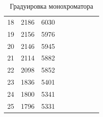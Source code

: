 \documentclass[a4paper, 12pt]{article}%
\begin{document}
\begin{table}[H]
\begin{center}
{\begin{tabular}{|rrr|rrrrrr}
					\multicolumn{1}{|r|}{18}    & \multicolumn{1}{r|}{2186}            & 6030                                                 &                      &                      &                       &                            &                                      &                                                      \\ \cline{1-3}
					\multicolumn{1}{|r|}{19}    & \multicolumn{1}{r|}{2156}            & 5976                                                 &                      &                      &                       &                            &                                      &                                                      \\ \cline{1-3}
					\multicolumn{1}{|r|}{20}    & \multicolumn{1}{r|}{2146}            & 5945                                                 &                      &                      &                       &                            &                                      &                                                      \\ \cline{1-3}
					\multicolumn{1}{|r|}{21}    & \multicolumn{1}{r|}{2114}            & 5882                                                 &                      &                      &                       &                            &                                      &                                                      \\ \cline{1-3}
					\multicolumn{1}{|r|}{22}    & \multicolumn{1}{r|}{2098}            & 5852                                                 &                      &                      &                       &                            &                                      &                                                      \\ \cline{1-3}
					\multicolumn{1}{|r|}{23}    & \multicolumn{1}{r|}{1836}            & 5401                                                 &                      &                      &                       &                            &                                      &                                                      \\ \cline{1-3}
					\multicolumn{1}{|r|}{24}    & \multicolumn{1}{r|}{1800}            & 5341                                                 &                      &                      &                       &                            &                                      &                                                      \\ \cline{1-3}
					\multicolumn{1}{|r|}{25}    & \multicolumn{1}{r|}{1796}            & 5331                                                 &                      &                      &                       &                            &                                      &                                                      \\ \cline{1-3}
				\end{tabular}%
			} 
		\end{center}
		\caption{Градуировка монохроматора}
		\label{table g}
	\end{table}
\end{document}
